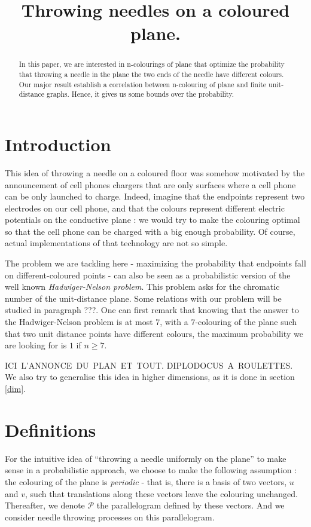 \documentclass[a4paper,11pt]{article}
\title{Throwing needles on a coloured plane.}
\theoremstyle{definition}
\theoremstyle{remark}
\begin{document}
\maketitle

\begin{abstract}  In this paper, we are interested in n-colourings of plane
that optimize the probability that throwing a needle in the plane the two ends of the
needle have different colours. Our major result establish a correlation between
n-colouring of plane and finite unit-distance graphs. Hence, it gives us
some bounds over the probability.\end{abstract}

\section{Introduction}
This idea of throwing a needle on a coloured floor was somehow motivated by the announcement of cell phones chargers that are only surfaces where a cell phone can be only launched to charge. Indeed, imagine that the endpoints represent two electrodes on our cell phone, and that the colours represent different electric potentials on the conductive plane : we would try to make the colouring optimal so that the cell phone can be charged with a big enough probability. Of course, actual implementations of that technology are not so simple.

The problem we are tackling here - maximizing the probability that endpoints fall on different-coloured points - can also be seen as a probabilistic version of the well known \emph{Hadwiger-Nelson problem}. This problem asks for the chromatic number of the unit-distance plane. Some relations with our problem will be studied in paragraph ???. One can first remark that knowing that the answer to the Hadwiger-Nelson problem is at most $7$, with a $7$-colouring of the plane such that two unit distance points have different colours, the maximum probability we are looking for is $1$ if $n \geq 7$.

ICI L'ANNONCE DU PLAN ET TOUT. DIPLODOCUS A ROULETTES.
We also try to generalise this idea in higher dimensions, as it is done in section \ref{dim}.
\section{Definitions}


For the intuitive idea of ``throwing a needle uniformly on the plane'' to make sense in a probabilistic approach, we choose to make the following assumption : 
the colouring of the plane is \textit{periodic} - that is, there is a basis of two vectors, $u$ and $v$, such that translations along these vectors leave the colouring unchanged. Thereafter, we denote $\mathcal{P}$ the parallelogram defined by these vectors. And we consider needle throwing processes on this parallelogram.
\end{document}
